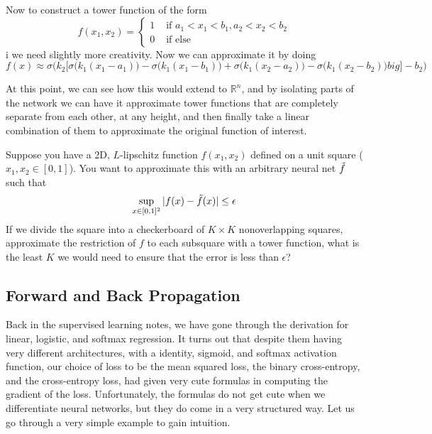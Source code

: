 \documentclass{article}
\begin{document}
    \begin{example} 
      Now to construct a tower function of the form 
        \[f(x_1, x_2) = \begin{cases} 1 & \text{ if } a_1 < x_1 < b_1, a_2 < x_2 < b_2 \\ 0 & \text{ if else} \end{cases}\]i
      we need slightly more creativity. Now we can approximate it by doing 
        \[f(x) \approx \sigma \bigg( k_2 \big[ \sigma\big( k_1 (x_1 - a_1)\big) - \sigma\big( k_1 (x_1 -b_1)\big) + \sigma \big( k_1 (x_2 - a_2)\big) - \sigma\big(k_1 (x_2 - b_2)\big)  big] - b_2\bigg)\]
    \end{example} 

    At this point, we can see how this would extend to $\mathbb{R}^n$, and by isolating parts of the network we can have it approximate tower functions that are completely separate from each other, at any height, and then finally take a linear combination of them to approximate the original function of interest.  

    \begin{theorem}
      Suppose you have a 2D, $L$-lipschitz function $f(x_1, x_2)$ defined on a unit square ($x_1, x_2 \in \left [0,1 \right ]$). You want to approximate this with an arbitrary neural net $\Tilde{f}$ such that
        \[\sup_{x \in [0, 1]^2} |f(x) - \Tilde{f}(x)| \leq \epsilon\]    
      If we divide the square into a checkerboard of $K \times K$ nonoverlapping squares, approximate the restriction of $f$ to each subsquare with a tower function, what is the least $K$ we would need to ensure that the error is less than $\epsilon$? 
    \end{theorem} 

  \subsection{Forward and Back Propagation}

    Back in the supervised learning notes, we have gone through the derivation for linear, logistic, and softmax regression. It turns out that despite them having very different architectures, with a identity, sigmoid, and softmax activation function, our choice of loss to be the mean squared loss, the binary cross-entropy, and the cross-entropy loss, had given very cute formulas in computing the gradient of the loss. Unfortunately, the formulas do not get cute when we differentiate neural networks, but they do come in a very structured way. Let us go through a very simple example to gain intuition. 
\end{document}
